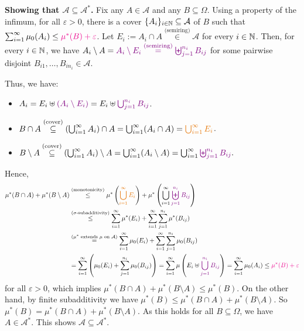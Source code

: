 \begin{enumerate}
\begin{pf}
\textbf{Showing that \(\mathcal{A}\subseteq \mathcal{A}^*\).}
Fix any \(A\in\mathcal{A}\) and any \(B\subseteq \Omega\). Using a property of
the infimum, for all \(\varepsilon>0\), there is a cover
\(\{A_{i}\}_{i\in\mathbb{N}}\subseteq \mathcal{A}\) of \(B\) such that
\(\sum_{i=1}^{\infty}\mu_0(A_i)\le{\color{magenta}\mu^*(B)+\varepsilon}\).
Let \(E_i:=A_i\cap A\overset{\text{(semiring)}}{\in}\mathcal{A}\) for every \(i\in\mathbb{N}\).
Then, for every \(i\in\mathbb{N}\), we have \(A_i\setminus A={\color{violet}A_i\setminus
E_i\overset{\text{(semiring)}}{=}\biguplus_{j=1}^{n_i}B_{ij}}\) for some pairwise
disjoint \(B_{i1},\dotsc,B_{in_i}\in\mathcal{A}\).

Thus, we have:
\begin{itemize}
\item \(A_i=E_i\uplus{\color{violet}(A_i\setminus E_i)}=E_i\uplus{\color{violet}\bigcup_{j=1}^{n_i}B_{ij}}\).
\item \(B\cap A\overset{\text{(cover)}}{\subseteq}
\left(\bigcup_{i=1}^{\infty}A_i\right)\cap A
=\bigcup_{i=1}^{\infty}(A_i\cap A)
=\orc{\bigcup_{i=1}^{\infty}E_i}\).
\item \(B\setminus A\overset{\text{(cover)}}{\subseteq}
\left(\bigcup_{i=1}^{\infty}A_i\right)\setminus A
=\bigcup_{i=1}^{\infty}(A_i\setminus A)
=\bigcup_{i=1}^{\infty}{\color{violet}\biguplus_{j=1}^{n_i}B_{ij}}.
\)
\end{itemize}
Hence,
\begin{align*}
\mu^*(B\cap A)+\mu^*(B\setminus A)
&\overset{\text{(monotonicity)}}{\le}
\mu^*\left(\orc{\bigcup_{i=1}^{\infty}E_i}\right)
+\mu^*\left(\bigcup_{i=1}^{\infty}\vc{\biguplus_{j=1}^{n_i}B_{ij}}\right) \\
&\overset{\text{(\(\sigma\)-subadditivity)}}{\le}
\sum_{i=1}^{\infty}\mu^*(E_i)+\sum_{i=1}^{\infty}\sum_{j=1}^{n_i}\mu^*(B_{ij}) \\
&\overset{\text{(\(\mu^*\) extends \(\mu\) on \(\mathcal{A}\))}}{=}\sum_{i=1}^{\infty}\mu_0(E_i)+\sum_{i=1}^{\infty}\sum_{j=1}^{n_i}\mu_0(B_{ij}) \\
&=\sum_{i=1}^{\infty}\left(\mu_0(E_i)+\sum_{j=1}^{n_i}\mu_0(B_{ij})\right)
=\sum_{i=1}^{\infty}\mu\left(E_i\uplus\vc{\bigcup_{j=1}^{n_i}B_{ij}}\right)
=\sum_{i=1}^{\infty}\mu_0(A_i)
\le\mgc{\mu^*(B)+\varepsilon}
\end{align*}
for all \(\varepsilon>0\), which implies \(\mu^*(B\cap A)+\mu^*(B\setminus A)
\le\mu^*(B)\). On the other hand, by finite subadditivity we have
\(\mu^*(B)\le\mu^*(B\cap A)+\mu^*(B\setminus A)\). So \(\mu^*(B)=\mu^*(B\cap
A)+\mu^*(B\setminus A)\). As this holds for all \(B\subseteq \Omega\), we have
\(A\in\mathcal{A}^*\). This shows \(\mathcal{A}\subseteq \mathcal{A}^*\).


\end{pf}
\end{enumerate}
